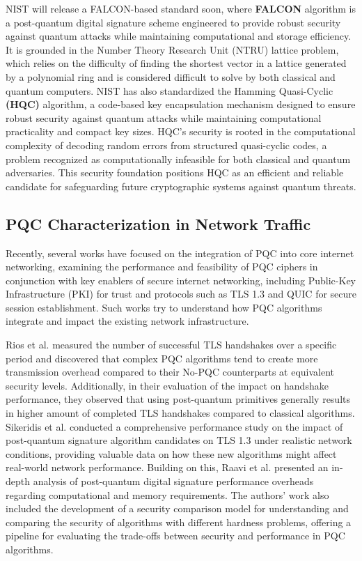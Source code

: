 \documentclass[10pt,journal]{IEEEtran}%
\begin{document}
NIST will release a FALCON-based standard soon, where \textbf{FALCON} algorithm is a post-quantum digital signature scheme engineered to provide robust security against quantum attacks while maintaining computational and storage efficiency. It is grounded in the Number Theory Research Unit (NTRU) lattice problem, which relies on the difficulty of finding the shortest vector in a lattice generated by a polynomial ring and is considered difficult to solve by both classical and quantum computers. NIST has also standardized the Hamming Quasi-Cyclic \textbf{(HQC)} algorithm, a code-based key encapsulation mechanism designed to ensure robust security against quantum attacks while maintaining computational practicality and compact key sizes. HQC’s security is rooted in the computational complexity of decoding random errors from structured quasi-cyclic codes, a problem recognized as computationally infeasible for both classical and quantum adversaries. This security foundation positions HQC as an efficient and reliable candidate for safeguarding future cryptographic systems against quantum threats.

\subsection{PQC Characterization in Network Traffic}

Recently, several works have focused on the integration of PQC into core internet networking, examining the performance and feasibility of PQC ciphers in conjunction with key enablers of secure internet networking, including Public-Key Infrastructure (PKI) for trust and protocols such as TLS 1.3 and QUIC for secure session establishment. Such works \cite{Sikeridis2020PostQuantumAI,Raavi_phd,Raavi_paper,PQC_KEMS,PQC_IoT,TLS_Mobile,liu2024post} try to understand how PQC algorithms integrate and impact the existing network infrastructure. 

Rios et al. \cite{10844321} measured the number of successful TLS handshakes over a specific period and discovered that complex PQC algorithms tend to create more transmission overhead compared to their No-PQC counterparts at equivalent security levels. Additionally, in their evaluation of the impact on handshake performance, they observed that using post-quantum primitives generally results in higher amount of completed TLS handshakes compared to classical algorithms. Sikeridis et al. \cite{Sikeridis2020PostQuantumAI} conducted a comprehensive performance study on the impact of post-quantum signature algorithm candidates on TLS 1.3 under realistic network conditions, providing valuable data on how these new algorithms might affect real-world network performance. Building on this, Raavi et al. \cite{Raavi_phd, Raavi_paper} presented an in-depth analysis of post-quantum digital signature performance overheads regarding computational and memory requirements. The authors’ work also included the development of a security comparison model for understanding and comparing the security of algorithms with different hardness problems, offering a pipeline for evaluating the trade-offs between security and performance in PQC algorithms. 
\end{document}
